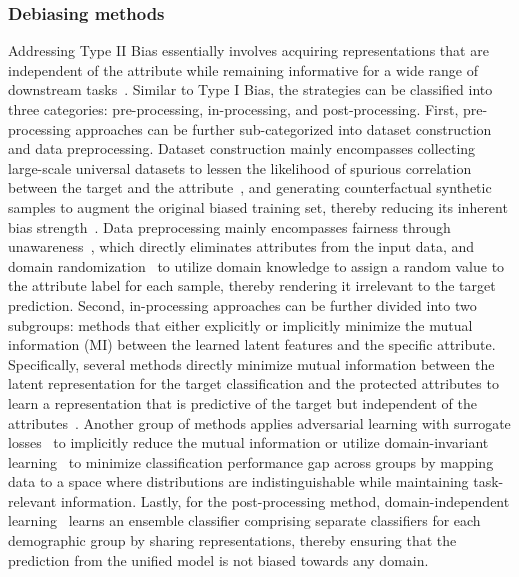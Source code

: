 \subsubsection{Debiasing methods}
Addressing Type II Bias essentially involves acquiring representations that are independent of the attribute while remaining informative for a wide range of downstream tasks~\cite{FNF}.
Similar to Type I Bias, the strategies can be classified into three categories: pre-processing, in-processing, and post-processing.
First, pre-processing approaches can be further sub-categorized into dataset construction and data preprocessing.
Dataset construction mainly encompasses collecting large-scale universal datasets to lessen the likelihood of spurious correlation between the target and the attribute~\cite{extreme_bias, sabaf}, and generating counterfactual synthetic samples to augment the original biased training set, thereby reducing its inherent bias strength~\cite{CGN,BiaSwap,Camel,DP_difference_fpr_GAN_debiasing}.  
Data preprocessing mainly encompasses fairness through unawareness~\cite{fairness_through_awareness}, which directly eliminates attributes from the input data, and domain randomization~\cite{domain_randomization} to utilize domain knowledge to assign a random value to the attribute label for each sample, thereby rendering it irrelevant to the target prediction. 
Second, in-processing approaches can be further divided into two subgroups: methods that either explicitly or implicitly minimize the mutual information (MI) between the learned latent features and the specific attribute.
Specifically, several methods directly minimize mutual information between the latent representation for the target classification and the protected attributes to learn a representation that is predictive of the target but independent of the attributes~\cite{learn_not_to_learn_Colored_MNIST,Back_MI,CSAD}. 
Another group of methods applies adversarial learning with surrogate losses~\cite{LfF_CelebA_Bias_conflicting,BlindEye_IMDB_eb,gradient_projection} to implicitly reduce the mutual information or utilize domain-invariant learning~\cite{ganin2016domain, zhao2019learning, albuquerque2019generalizing, Group_DRO, PGI_invariant, EIIL} to minimize classification performance gap across groups by mapping data to a space where distributions are indistinguishable while maintaining task-relevant information. 
Lastly, for the post-processing method, domain-independent learning~\cite{DI} learns an ensemble classifier comprising separate classifiers for each demographic group by sharing representations, thereby ensuring that the prediction from the unified model is not biased towards any domain.











